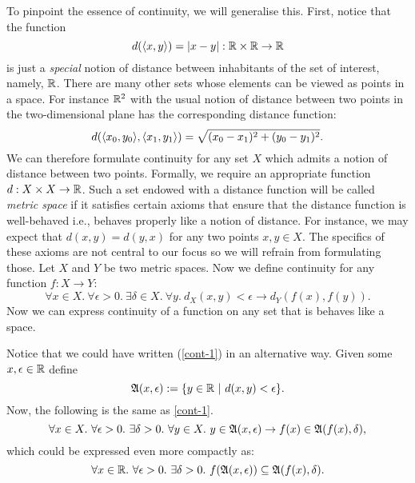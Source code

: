 To pinpoint the essence of continuity, we will generalise this. First, notice that the
function
\begin{equation*}
  d(\langle x , y \rangle) = | x - y | : \mathbb{R}{} \times \mathbb{R}{} \rightarrow \mathbb{R}{}
\end{equation*}
is just a \emph{special} notion of distance between inhabitants of the set of interest, namely,
$\mathbb{R}{}$. There are many other sets whose elements can be viewed as points in a space.
For instance $\mathbb{R}{}^2$ with the usual notion of distance between two points in the
two-dimensional plane has the corresponding distance function:
\begin{equation*}
  d(\langle x_0 , y_0 \rangle , \langle x_1 , y_1 \rangle) = \sqrt{(x_0 - x_1)^2 + (y_0 - y_1)^2}.
\end{equation*}
We can therefore formulate continuity for any set $X$ which admits a notion of distance
between two points. Formally, we require an appropriate function $d : X \times X \rightarrow \mathbb{R}{}$.
Such a set endowed with a distance function will be called \emph{metric space} if it
satisfies certain axioms that ensure that the distance function is well-behaved i.e.,
behaves properly like a notion of distance. For instance, we may expect that $d(x, y) =
d(y, x)$ for any two points $x, y \in X$. The specifics of these axioms are not central to
our focus so we will refrain from formulating those. Let $X$ and $Y$ be two metric spaces.
Now we define continuity for any function $f : X \rightarrow Y$:
\begin{equation}\label{cont-1}
  \forall x \in X.~ \forall \epsilon > 0.~ \exists \delta \in X.~ \forall y.~ d_X(x, y) < \epsilon \rightarrow d_Y(f(x), f(y)).
\end{equation}
Now we can express continuity of a function on any set that is behaves like a space.

Notice that we could have written (\ref{cont-1}) in an alternative way. Given
some $x, \epsilon \in \mathbb{R}{}$ define
\begin{equation*}
  \mathfrak{A}(x, \epsilon) := \{ y \in \mathbb{R}{}~|~d(x, y) < \epsilon \}.
\end{equation*}
Now, the following is the same as \ref{cont-1}.
\begin{equation*}
  \forall x \in X.~ \forall \epsilon > 0.~ \exists \delta > 0.~ \forall y \in X.~ y \in \mathfrak{A}(x, \epsilon) \rightarrow f(x) \in \mathfrak{A}(f(x), \delta),
\end{equation*}
which could be expressed even more compactly as:
\begin{equation}\label{cont-2}
  \forall x \in \mathbb{R}{}.~ \forall \epsilon > 0.~ \exists \delta > 0.~ f(\mathfrak{A}(x, \epsilon)) \subseteq \mathfrak{A}(f(x), \delta).
\end{equation}

